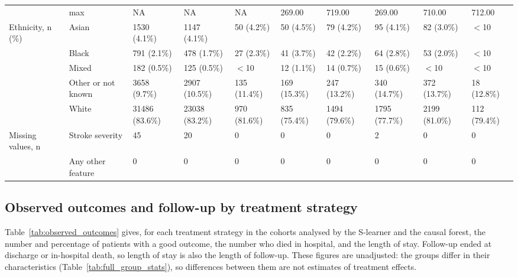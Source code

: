 \begin{landscape}
{\begin{longtable}[]{@{}llllllllll@{}}
& max & NA & NA & NA & 269.00 & 719.00 & 269.00 & 710.00 & 712.00 \\
\addlinespace
Ethnicity, n (\%) & Asian & 1530 (4.1\%) & 1147 (4.1\%) & 50 (4.2\%) & 50 (4.5\%) & 79 (4.2\%) & 95 (4.1\%) & 82 (3.0\%) & $<$10 \\
& Black & 791 (2.1\%) & 478 (1.7\%) & 27 (2.3\%) & 41 (3.7\%) & 42 (2.2\%) & 64 (2.8\%) & 53 (2.0\%) & $<$10 \\
& Mixed & 182 (0.5\%) & 125 (0.5\%) & $<$10 & 12 (1.1\%) & 14 (0.7\%) & 15 (0.6\%) & $<$10 & $<$10 \\
& Other or not known & 3658 (9.7\%) & 2907 (10.5\%) & 135 (11.4\%) & 169 (15.3\%) & 247 (13.2\%) & 340 (14.7\%) & 372 (13.7\%) & 18 (12.8\%) \\
& White & 31486 (83.6\%) & 23038 (83.2\%) & 970 (81.6\%) & 835 (75.4\%) & 1494 (79.6\%) & 1795 (77.7\%) & 2199 (81.0\%) & 112 (79.4\%) \\
\addlinespace
Missing values, n & Stroke severity & 45 & 20 & 0 & 0 & 0 & 2 & 0 & 0 \\
& Any other feature & 0 & 0 & 0 & 0 & 0 & 0 & 0 & 0 \\

\end{longtable}
}
\end{landscape}

\subsection{Observed outcomes and follow-up by treatment strategy}\label{sec:supp_observed}

Table~\ref{tab:observed_outcomes} gives, for each treatment strategy in the cohorts analysed by the S-learner and the causal forest, the number and percentage of patients with a good outcome, the number who died in hospital, and the length of stay. Follow-up ended at discharge or in-hospital death, so length of stay is also the length of follow-up. These figures are unadjusted: the groups differ in their characteristics (Table~\ref{tab:full_group_stats}), so differences between them are not estimates of treatment effects.

